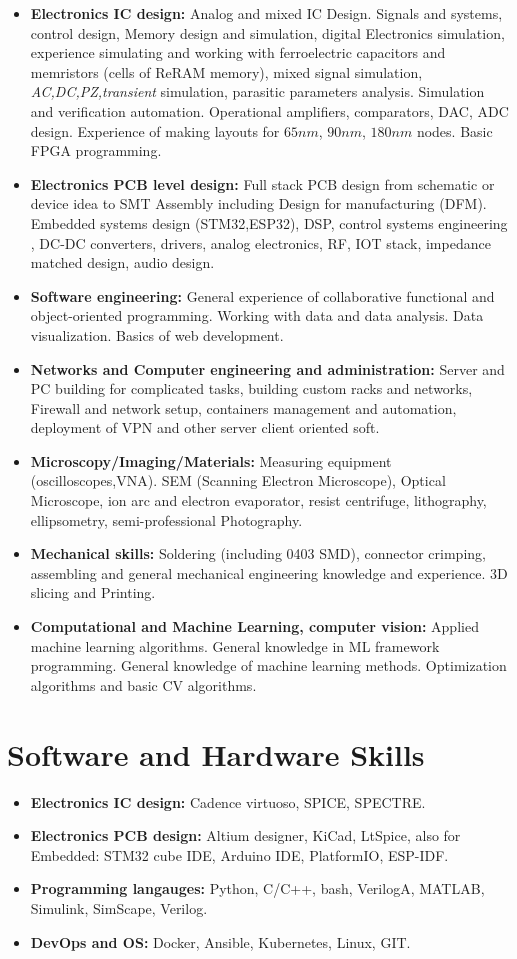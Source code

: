 \documentclass{article}
\begin{document}
\begin{itemize}
\item \textbf{Electronics IC design:} Analog and mixed IC Design. Signals and systems, control design, Memory design and simulation, digital Electronics simulation, experience simulating and working with ferroelectric capacitors and memristors (cells of ReRAM memory),   mixed signal simulation, \textit{AC,DC,PZ,transient} simulation, parasitic parameters analysis. Simulation and verification automation. Operational amplifiers, comparators, DAC, ADC design. Experience of making layouts for $65 nm$, $90nm$, $180nm$ nodes. Basic FPGA programming.
\item \textbf{Electronics PCB level design:} Full stack PCB design from schematic or device idea to SMT Assembly including Design for manufacturing (DFM). Embedded systems design (STM32,ESP32), DSP,  control systems engineering , DC-DC converters, drivers, analog electronics, RF, IOT stack, impedance matched design, audio design.
\item \textbf{Software engineering:} General experience of collaborative functional and object-oriented programming. Working with data and data analysis. Data visualization. Basics of web development.
\item \textbf{Networks and Computer engineering and administration:} Server and PC building for complicated tasks, building custom racks and networks, Firewall and network setup, containers management and automation, deployment of VPN and other server client oriented soft.
\item \textbf{Microscopy/Imaging/Materials:} Measuring equipment (oscilloscopes,VNA). SEM (Scanning Electron Microscope), Optical Microscope, ion arc and electron evaporator, resist centrifuge, lithography, ellipsometry, semi-professional Photography.
\item \textbf{Mechanical skills:} Soldering (including 0403 SMD), connector crimping,  assembling and general mechanical engineering knowledge and experience. 3D slicing and Printing.
\item \textbf{Computational and Machine Learning, computer vision:} Applied machine learning algorithms. General knowledge in ML framework programming. General knowledge of machine learning methods. Optimization algorithms and basic CV algorithms.
\end{itemize}
 
\section{Software and Hardware Skills}
\begin{itemize}
\item \textbf{Electronics IC design:} Cadence virtuoso, SPICE, SPECTRE.
\item \textbf{Electronics PCB design:} Altium designer, KiCad, LtSpice, also for Embedded: STM32 cube IDE, Arduino IDE, PlatformIO, ESP-IDF.
\item \textbf{Programming langauges:} Python, C/C++, bash, VerilogA, MATLAB, Simulink, SimScape, Verilog.
\item \textbf{DevOps and OS:} Docker, Ansible, Kubernetes, Linux, GIT.
\end{itemize}
\end{document}
